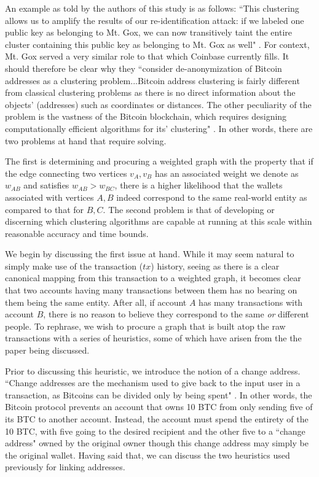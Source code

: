 \documentclass{article}
\begin{document}
An example as told by the authors of this study is as follows: ``This clustering allows us to amplify the results of our re-identification attack: if we labeled one public key as belonging to Mt. Gox, we can now transitively taint the entire cluster containing this public key as belonging to Mt. Gox as well" \cite{fistful}. For context, Mt. Gox served a very similar role to that which Coinbase currently fills. It should therefore be clear why they ``consider de-anonymization of Bitcoin addresses as a clustering problem...Bitcoin address clustering is fairly different from classical clustering problems as there is no direct information about the objects' (addresses) such as coordinates or distances. The other peculiarity of the problem is the vastness of the Bitcoin blockchain, which requires designing computationally efficient algorithms for its' clustering" \cite{automatic}. In other words, there are two problems at hand that require solving. 

The first is determining and procuring a weighted graph with the property that if the edge connecting two vertices $v_{A},v_{B}$ has an associated weight we denote as $w_{AB}$ and satisfies $w_{AB} > w_{BC}$, there is a higher likelihood that the wallets associated with vertices $A,B$ indeed correspond to the same real-world entity as compared to that for $B,C$. The second problem is that of developing or discerning which clustering algorithms are capable at running at this scale within reasonable accuracy and time bounds.

We begin by discussing the first issue at hand. While it may seem natural to simply make use of the transaction ($tx$) history, seeing as there is a clear canonical mapping from this transaction to a weighted graph, it becomes clear that two accounts having many transactions between them has no bearing on them being the same entity. After all, if account $A$ has many transactions with account $B$, there is no reason to believe they correspond to the same \textit{or} different people. To rephrase, we wish to procure a graph that is built atop the raw transactions with a series of heuristics, some of which have arisen from the the paper being discussed.

Prior to discussing this heuristic, we introduce the notion of a change address. ``Change addresses are the mechanism used to give back to the input user in a transaction, as Bitcoins can be divided only by being spent" \cite{fistful}. In other words, the Bitcoin protocol prevents an account that owns 10 BTC from only sending five of its BTC to another account. Instead, the account must spend the entirety of the 10 BTC, with five going to the desired recipient and the other five to a ``change address" owned by the original owner though this change address may simply be the original wallet. Having said that, we can discuss the two heuristics used previously for linking addresses.
\end{document}
